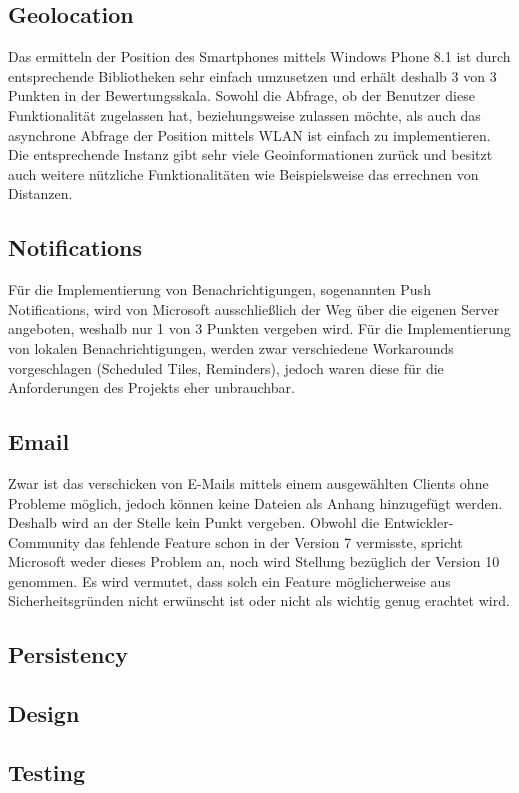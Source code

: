 \subsection{Geolocation}

Das ermitteln der Position des Smartphones mittels Windows Phone 8.1 ist durch entsprechende Bibliotheken sehr einfach umzusetzen und erhält deshalb 3 von 3 Punkten in der Bewertungsskala. Sowohl die Abfrage, ob der Benutzer diese Funktionalität zugelassen hat, beziehungsweise zulassen möchte, als auch das asynchrone Abfrage der Position mittels WLAN ist einfach zu implementieren. Die entsprechende Instanz gibt sehr viele Geoinformationen zurück und besitzt auch weitere nützliche Funktionalitäten wie Beispielsweise das errechnen von Distanzen.

\subsection{Notifications}

Für die Implementierung von Benachrichtigungen, sogenannten Push Notifications, wird von Microsoft ausschließlich der Weg über die eigenen Server angeboten, weshalb nur 1 von 3 Punkten vergeben wird. Für die Implementierung von lokalen Benachrichtigungen, werden zwar verschiedene Workarounds vorgeschlagen (Scheduled Tiles, Reminders), jedoch waren diese für die Anforderungen des Projekts eher unbrauchbar.

\subsection{Email}

Zwar ist das verschicken von E-Mails mittels einem ausgewählten Clients ohne Probleme möglich, jedoch können keine Dateien als Anhang hinzugefügt werden. Deshalb wird an der Stelle kein Punkt vergeben. Obwohl die Entwickler-Community das fehlende Feature schon in der Version 7 vermisste, spricht Microsoft weder dieses Problem an, noch wird Stellung bezüglich der Version 10 genommen. Es wird vermutet, dass solch ein Feature möglicherweise aus Sicherheitsgründen nicht erwünscht ist oder nicht als wichtig genug erachtet wird.

\subsection{Persistency}

\subsection{Design}

\subsection{Testing}


